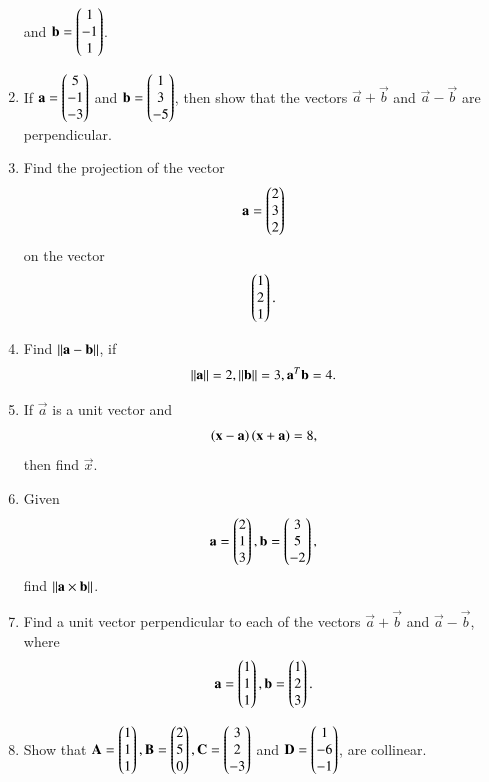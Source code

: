 \begin{enumerate}[label=\arabic*.,ref=\thesubsection.\theenumi]
  and 
$\mathbf{b}=\begin{pmatrix}1\\-1\\1\end{pmatrix}$.
\item If 
$\mathbf{a}=\begin{pmatrix}5\\-1\\-3\end{pmatrix}$
  and 
$\mathbf{b}=\begin{pmatrix}1\\3\\-5\end{pmatrix}$,
%
then show that the vectors $\vec{a}+\vec{b}$ and $\vec{a}-\vec{b}$ are perpendicular.
%
\item Find the projection of the vector 
\begin{align}
\mathbf{a} = \begin{pmatrix}2\\3\\2\end{pmatrix}
\end{align}
on the vector
\begin{align}
\begin{pmatrix}1\\2\\1\end{pmatrix}.
\end{align}
%
\item Find $\left\lVert\mathbf{a}-\mathbf{b}\right\rVert$, if 
\begin{align}
\left\lVert\mathbf{a}\right\rVert = 2, 
\left\lVert\mathbf{b}\right\rVert = 3,
\mathbf{a}^T\mathbf{b} = 4.
\end{align}
%
\item If $\vec{a}$ is a unit vector and 
%
\begin{align}
\left(\mathbf{x}-\mathbf{a}\right)\left(\mathbf{x}+\mathbf{a}\right) = 8, 
\end{align}
%
then find $\vec{x}$.
%
\item Given
\begin{align}
\mathbf{a}=\begin{pmatrix}2\\1\\3\end{pmatrix},
\mathbf{b}=\begin{pmatrix}3\\5\\-2\end{pmatrix},
\end{align}
find $\left\lVert\mathbf{a} \times \mathbf{b}\right\rVert$.
%
\item Find a unit vector perpendicular to each of the vectors
$\vec{a}+\vec{b}$ and $\vec{a}-\vec{b}$, where 
\begin{align}
\mathbf{a}=\begin{pmatrix}1\\1\\1\end{pmatrix},
\mathbf{b}=\begin{pmatrix}1\\2\\3\end{pmatrix}.
\end{align}
%
\item Show that 
$\mathbf{A}=\begin{pmatrix}1\\1\\1\end{pmatrix}, \mathbf{B}=\begin{pmatrix}2\\5\\0\end{pmatrix}, \mathbf{C}=\begin{pmatrix}3\\2\\-3\end{pmatrix}$  and $ \mathbf{D}=\begin{pmatrix}1\\-6\\-1\end{pmatrix}$, are collinear.

\end{enumerate}
